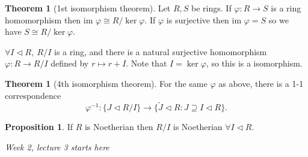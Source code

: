 \documentclass[a4paper]{article}
\newcommand{\im}{\text{im }}
\theoremstyle{definition}
\newtheorem{prop}[defn]{Proposition}
\newtheorem{thm}[defn]{Theorem}
\begin{document}
\begin{thm}[1st isomorphism theorem]
Let $R,S$ be rings. If $\varphi : R\rightarrow S$ is a ring homomorphism then $\im \varphi\cong R/\ker \varphi$. If $\varphi$ is surjective then $\im \varphi=S$ so we have $S\cong R/\ker \varphi$.

$\forall I\lhd R,\ R/I$ is a ring, and there is a natural surjective homomorphism $\varphi:R\rightarrow R/I$ defined by $r\mapsto r+I$. Note that $I=\ker\varphi$, so this is a isomorphism.
\end{thm}
\begin{thm}[4th isomorphism theorem]
For the same $\varphi$ as above, there is a 1-1 correspondence
\[
\varphi^{-1}:\{J\lhd R/I\} \rightarrow \{\widetilde J \lhd R: J\supseteq I\lhd R\}.
\]
\end{thm}
\begin{prop}
If $R$ is Noetherian then $R/I$ is Noetherian $\forall I\lhd R$.
\end{prop}

\begin{flushright}
\textit{Week 2, lecture 3 starts here}
\end{flushright}
\end{document}

